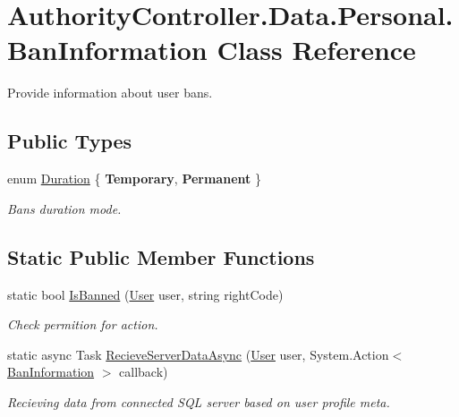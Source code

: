 \hypertarget{class_authority_controller_1_1_data_1_1_personal_1_1_ban_information}{}\section{Authority\+Controller.\+Data.\+Personal.\+Ban\+Information Class Reference}
\label{class_authority_controller_1_1_data_1_1_personal_1_1_ban_information}


Provide information about user bans.  


\subsection*{Public Types}
\begin{DoxyCompactItemize}
\item 
enum \mbox{\hyperlink{class_authority_controller_1_1_data_1_1_personal_1_1_ban_information_a127a28a1db99b43e2540f18949921a7d}{Duration}} \{ {\bfseries Temporary}, 
{\bfseries Permanent}
 \}
\begin{DoxyCompactList}\small\item\em Ban\textquotesingle{}s duration mode. \end{DoxyCompactList}\end{DoxyCompactItemize}
\subsection*{Static Public Member Functions}
\begin{DoxyCompactItemize}
\item 
static bool \mbox{\hyperlink{class_authority_controller_1_1_data_1_1_personal_1_1_ban_information_af71a082c91c5d96b262ccbafe22c821a}{Is\+Banned}} (\mbox{\hyperlink{class_authority_controller_1_1_data_1_1_personal_1_1_user}{User}} user, string right\+Code)
\begin{DoxyCompactList}\small\item\em Check permition for action. \end{DoxyCompactList}\item 
static async Task \mbox{\hyperlink{class_authority_controller_1_1_data_1_1_personal_1_1_ban_information_a70cc71c093fb9f5407b60a88a8361a9b}{Recieve\+Server\+Data\+Async}} (\mbox{\hyperlink{class_authority_controller_1_1_data_1_1_personal_1_1_user}{User}} user, System.\+Action$<$ \mbox{\hyperlink{class_authority_controller_1_1_data_1_1_personal_1_1_ban_information}{Ban\+Information}} $>$ callback)
\begin{DoxyCompactList}\small\item\em Recieving data from connected S\+QL server based on user profile meta. \end{DoxyCompactList}\end{DoxyCompactItemize}
